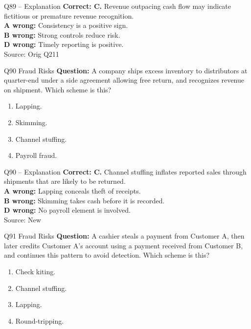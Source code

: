 \documentclass[aspectratio=169,10pt]{beamer}
\begin{document}
\begin{frame}[t]{Q89 -- Explanation}
	\footnotesize
	\textbf{Correct: C.} Revenue outpacing cash flow may indicate fictitious or premature revenue recognition. \\[5pt]
\textbf{A wrong:} Consistency is a positive sign. \\[3pt]
\textbf{B wrong:} Strong controls reduce risk. \\[3pt]
\textbf{D wrong:} Timely reporting is positive. \\[3pt]
	\vfill {\tiny Source: Orig Q211}
\end{frame}

\begin{frame}[t]{Q90 \hfill {\scriptsize Fraud Risks}}
	\small
	\textbf{Question:} A company ships excess inventory to distributors at quarter-end under a side agreement allowing free return, and recognizes revenue on shipment. Which scheme is this?
	\begin{enumerate}[label=\Alph*.,itemsep=1pt,topsep=3pt]
			\item Lapping.
			\item Skimming.
			\item Channel stuffing.
			\item Payroll fraud.
	\end{enumerate}
\end{frame}

\begin{frame}[t]{Q90 -- Explanation}
	\footnotesize
	\textbf{Correct: C.} Channel stuffing inflates reported sales through shipments that are likely to be returned. \\[5pt]
\textbf{A wrong:} Lapping conceals theft of receipts. \\[3pt]
\textbf{B wrong:} Skimming takes cash before it is recorded. \\[3pt]
\textbf{D wrong:} No payroll element is involved. \\[3pt]
	\vfill {\tiny Source: New}
\end{frame}

\begin{frame}[t]{Q91 \hfill {\scriptsize Fraud Risks}}
	\small
	\textbf{Question:} A cashier steals a payment from Customer A, then later credits Customer A's account using a payment received from Customer B, and continues this pattern to avoid detection. Which scheme is this?
	\begin{enumerate}[label=\Alph*.,itemsep=1pt,topsep=3pt]
			\item Check kiting.
			\item Channel stuffing.
			\item Lapping.
			\item Round-tripping.
	\end{enumerate}
\end{frame}
\end{document}
